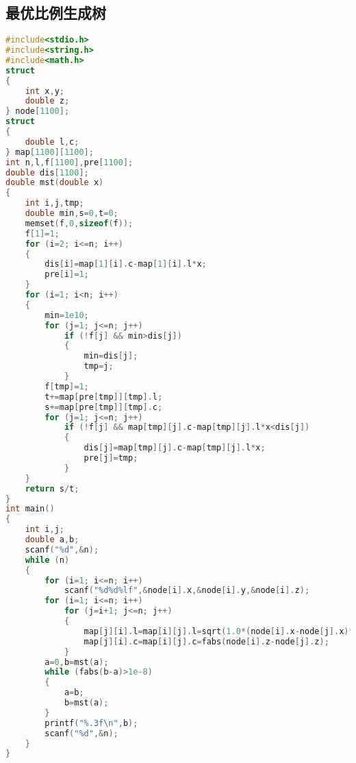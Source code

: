 \subsection{最优比例生成树}
	\begin{lstlisting}[language=c++]
#include<stdio.h>
#include<string.h>
#include<math.h>
struct
{
	int x,y;
	double z;
} node[1100];
struct
{
	double l,c;
} map[1100][1100];
int n,l,f[1100],pre[1100];
double dis[1100];
double mst(double x)
{
	int i,j,tmp;
	double min,s=0,t=0;
	memset(f,0,sizeof(f));
	f[1]=1;
	for (i=2; i<=n; i++)
	{
		dis[i]=map[1][i].c-map[1][i].l*x;
		pre[i]=1;
	}
	for (i=1; i<n; i++)
	{
		min=1e10;
		for (j=1; j<=n; j++)
			if (!f[j] && min>dis[j])
			{
				min=dis[j];
				tmp=j;
			}
		f[tmp]=1;
		t+=map[pre[tmp]][tmp].l;
		s+=map[pre[tmp]][tmp].c;
		for (j=1; j<=n; j++)
			if (!f[j] && map[tmp][j].c-map[tmp][j].l*x<dis[j])
			{
				dis[j]=map[tmp][j].c-map[tmp][j].l*x;
				pre[j]=tmp;
			}
	}
	return s/t;
}
int main()
{
	int i,j;
	double a,b;
	scanf("%d",&n);
	while (n)
	{
		for (i=1; i<=n; i++)
			scanf("%d%d%lf",&node[i].x,&node[i].y,&node[i].z);
		for (i=1; i<=n; i++)
			for (j=i+1; j<=n; j++)
			{
				map[j][i].l=map[i][j].l=sqrt(1.0*(node[i].x-node[j].x)*(node[i].x-node[j].x)+(node[i].y-node[j].y)*(node[i].y-node[j].y));
				map[j][i].c=map[i][j].c=fabs(node[i].z-node[j].z);
			}
		a=0,b=mst(a);
		while (fabs(b-a)>1e-8)
		{
			a=b;
			b=mst(a);
		}
		printf("%.3f\n",b);
		scanf("%d",&n);
	}
}
	\end{lstlisting}
